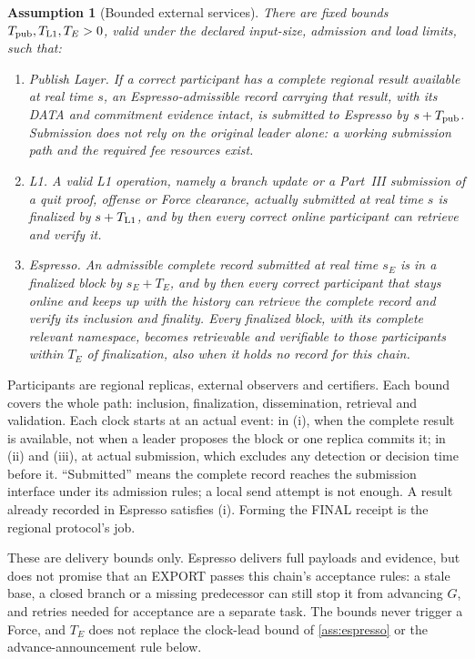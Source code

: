 \documentclass[11pt,a4paper]{article}
\newtheorem{assumption}[assumption]{Assumption}
\newcounter{protocol}
\begin{document}
\begin{assumption}[Bounded external services]
\label{ass:services}
There are fixed bounds $T_{\rm pub},T_{\rm L1},T_E>0$, valid under the
declared input-size, admission and load limits, such that:
\begin{enumerate}[label=(\roman*)]
\item \emph{Publish Layer.} If a correct participant has a complete
regional result available at real time $s$, an Espresso-admissible record
carrying that result, with its DATA and commitment evidence intact, is
submitted to Espresso by $s+T_{\rm pub}$. Submission does not rely on the
original leader alone: a working submission path and the required fee
resources exist.
\item \emph{L1.} A valid L1 operation, namely a branch update or a
Part~III submission of a quit proof, offense or Force clearance, actually
submitted at real time $s$ is finalized by $s+T_{\rm L1}$, and by then
every correct online participant can retrieve and verify it.
\item \emph{Espresso.} An admissible complete record submitted at real
time $s_E$ is in a finalized block by $s_E+T_E$, and by then every correct
participant that stays online and keeps up with the history can retrieve
the complete record and verify its inclusion and finality. Every finalized
block, with its complete relevant namespace, becomes retrievable and
verifiable to those participants within $T_E$ of finalization, also when
it holds no record for this chain.
\end{enumerate}
\end{assumption}
Participants are regional replicas, external observers and certifiers.
Each bound covers the whole path: inclusion, finalization, dissemination,
retrieval and validation. Each clock starts at an actual event: in (i),
when the complete result is available, not when a leader proposes the
block or one replica commits it; in (ii) and (iii), at actual submission,
which excludes any detection or decision time before it. ``Submitted''
means the complete record reaches the submission interface under its
admission rules; a local send attempt is not enough. A result already
recorded in Espresso satisfies (i). Forming the FINAL receipt is the
regional protocol's job.

These are delivery bounds only. Espresso delivers full payloads and
evidence, but does not promise that an EXPORT passes this chain's
acceptance rules: a stale base, a closed branch or a missing predecessor
can still stop it from advancing $G$, and retries needed for acceptance
are a separate task. The bounds never trigger a Force, and $T_E$ does not
replace the clock-lead bound of \cref{ass:espresso} or the
advance-announcement rule below.
\end{document}

